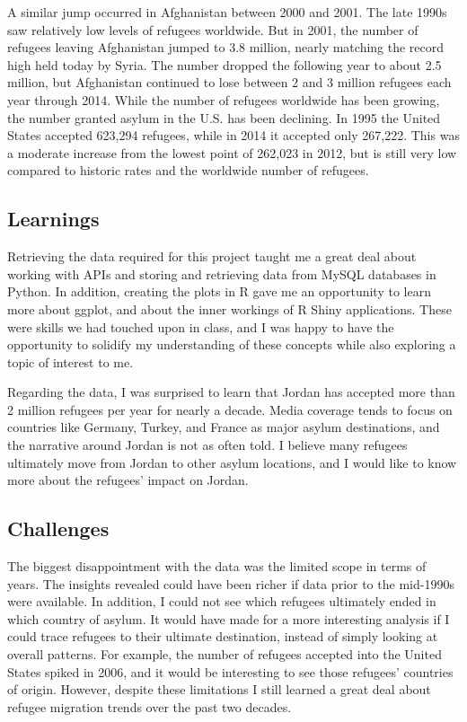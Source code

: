 \documentclass{article}
\begin{document}
\noindent A similar jump occurred in Afghanistan between 2000 and 2001. The late 1990s saw relatively low levels of refugees worldwide. But in 2001, the number of refugees leaving Afghanistan jumped to 3.8 million, nearly matching the record high held today by Syria. The number dropped the following year to about 2.5 million, but Afghanistan continued to lose between 2 and 3 million refugees each year through 2014.
While the number of refugees worldwide has been growing, the number granted asylum in the U.S. has been declining. In 1995 the United States accepted 623,294 refugees, while in 2014 it accepted only 267,222. This was a moderate increase from the lowest point of 262,023 in 2012, but is still very low compared to historic rates and the worldwide number of refugees.


\subsection{Learnings}

\noindent Retrieving the data required for this project taught me a great deal about working with APIs and storing and retrieving data from MySQL databases in Python. In addition, creating the plots in R gave me an opportunity to learn more about ggplot, and about the inner workings of R Shiny applications. These were skills we had touched upon in class, and I was happy to have the opportunity to solidify my understanding of these concepts while also exploring a topic of interest to me.\vspace{2mm}

\noindent Regarding the data, I was surprised to learn that Jordan has accepted more than 2 million refugees per year for nearly a decade. Media coverage tends to focus on countries like Germany, Turkey, and France as major asylum destinations, and the narrative around Jordan is not as often told. I believe many refugees ultimately move from Jordan to other asylum locations, and I would like to know more about the refugees' impact on Jordan. 

\subsection{Challenges}

\noindent The biggest disappointment with the data was the limited scope in terms of years. The insights revealed could have been richer if data prior to the mid-1990s were available. In addition, I could not see which refugees ultimately ended in which country of asylum. It would have made for a more interesting analysis if I could trace refugees to their ultimate destination, instead of simply looking at overall patterns. For example, the number of refugees accepted into the United States spiked in 2006, and it would be interesting to see those refugees' countries of origin. However, despite these limitations I still learned a great deal about refugee migration trends over the past two decades.
\end{document}
